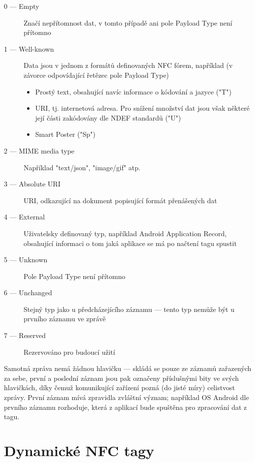     \begin{description}
        \item [0 --- Empty] Značí nepřítomnost dat, v tomto případě ani pole 
            Payload Type není přítomno
        \item [1 --- Well-known] Data jsou v jednom z formátů definovaných NFC
            fórem, například (v závorce odpovídající řetězec pole Payload Type)
            \begin{itemize}
                \item Prostý text, obsahující navíc informace o kódování a 
                    jazyce ("T")
                \item URI, tj. internetová adresa. Pro snížení množství dat jsou
                    však některé její části zakódovány dle NDEF standardů ("U")
                \item Smart Poster ("Sp")
            \end{itemize}
        \item [2 --- MIME media type] Například "text/json", "image/gif" atp.
        \item [3 --- Absolute URI] URI, odkazující na dokument popisující formát
            přenášených dat
        \item [4 --- External] Uživatelsky definovaný typ, například Android
            Application Record, obsahující informaci o tom jaká aplikace se má
            po načtení tagu spustit
        \item [5 --- Unknown] Pole Payload Type není přítomno
        \item [6 --- Unchanged] Stejný typ jako u předcházejícího záznamu --- 
            tento typ nemůže být u prvního záznamu ve zprávě
        \item [7 --- Reserved] Rezervováno pro budoucí užití
    \end{description}
    
    Samotná zpráva nemá žádnou hlavičku --- skládá se
    pouze ze záznamů zařazených za sebe, první a poslední záznam jsou pak označeny
    příslušnými bity ve svých hlavičkách, díky čemuž komunikující zařízení
    pozná (do jisté míry) celistvost zprávy.
    První záznam mívá zpravidla zvláštní význam; 
    například OS Android dle prvního záznamu rozhoduje, která z aplikací
    bude spuštěna pro zpracování dat z tagu.


\section{Dynamické NFC tagy}

